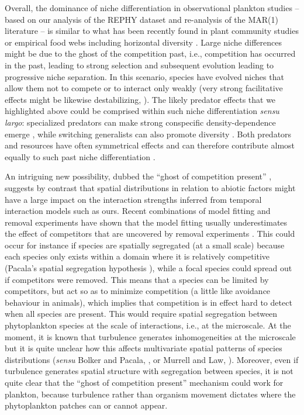 \documentclass[9pt,twocolumn,twoside,lineno]{pnas-new}
\begin{document}
Overall, the dominance of niche differentiation in observational plankton
studies -- based on our analysis of the REPHY dataset and re-analysis
of the MAR(1) literature -- is similar to what has been recently
found in plant community studies \cite{volkov_patterns_2007,adler_competition_2018}
or empirical food webs including horizontal diversity \cite{barabas_self-regulation_2017}.
Large niche differences might be due to the ghost of the competition
past, i.e., competition has occurred in the past, leading to strong
selection and subsequent evolution leading to progressive niche separation.
In this scenario, species have evolved niches that allow them not
to compete or to interact only weakly (very strong facilitative effects
might be likewise destabilizing, ). The
likely predator effects that we highlighted above could be comprised
within such niche differentiation \emph{sensu largo}: specialized
predators can make strong conspecific density-dependence emerge \cite{bagchi_pathogens_2014,comita_testing_2014},
while switching generalists can also promote diversity \cite{vallina2014maximal}.
Both predators and resources have often symmetrical effects and can
therefore contribute almost equally to such past niche differentiation \cite{chesson_updates_2018}.

An intriguing new possibility, dubbed the ``ghost of competition
present'' \cite{tuck_strong_2018}, suggests by contrast that
spatial distributions in relation to abiotic factors might have a
large impact on the interaction strengths inferred from temporal interaction
models such as ours. Recent combinations of model fitting and removal
experiments have shown that the model fitting usually underestimates
the effect of competitors that are uncovered by removal experiments \cite{tuck_strong_2018,adler_weak_2018}.
This could occur for instance if species are spatially segregated
(at a small scale) because each species only exists within a domain
where it is relatively competitive (Pacala's spatial segregation hypothesis \cite{pacala1997biologically}),
while a focal species could spread out if competitors were removed.
This means that a species can be limited by competitors, but act so
as to minimize competition (a little like avoidance behaviour in animals),
which implies that competition is in effect hard to detect when all
species are present. This would require spatial segregation between
phytoplankton species at the scale of interactions, i.e., at the microscale.
At the moment, it is known that turbulence generates inhomogeneities
at the microscale \cite{barton_impact_2014,breier_emergence_2018}
but it is quite unclear how this affects multivariate spatial patterns
of species distributions (\textit{sensu} Bolker and Pacala, ,
or Murrell and Law, ). Moreover,
even if turbulence generates spatial structure with segregation between
species, it is not quite clear that the ``ghost of competition present''
mechanism could work for plankton, because turbulence rather than
organism movement dictates where the phytoplankton patches can or
cannot appear.
\end{document}
